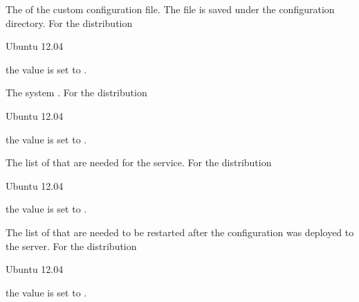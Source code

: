 
The  of the custom configuration file. The file is saved
under the configuration directory.
For the distribution
\begin{inparaitem}
\item[\TheDistribution{ubuntu}] Ubuntu 12.04
\end{inparaitem}
the value is set to .


The system . 
For the distribution
\begin{inparaitem}
\item[\TheDistribution{ubuntu}] Ubuntu 12.04
\end{inparaitem}
the value is set to .


The list of  that are needed for the service. 
For the distribution
\begin{inparaitem}
\item[\TheDistribution{ubuntu}] Ubuntu 12.04
\end{inparaitem}
the value is set to .


The list of  that are needed to be restarted after the 
configuration was deployed to the server.
For the distribution
\begin{inparaitem}
\item[\TheDistribution{ubuntu}] Ubuntu 12.04
\end{inparaitem}
the value is set to .


